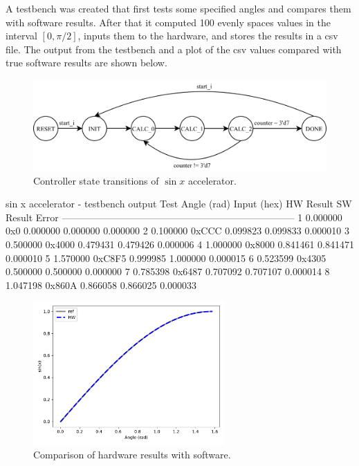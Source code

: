 \documentclass[../main.tex]{subfiles}
\begin{document}
\newpage

A testbench was created that first tests some specified angles and compares them with software results. After that it computed 100 evenly spaces values in the interval $[0, \pi/2]$, inputs them to the hardware, and stores the results in a csv file. The output from the testbench and a plot of the csv values compared with true software results are shown below.

\begin{figure}[h]
    \centering
    \includegraphics[width=\linewidth]{assets/q5_cont.png}
    \caption{Controller state transitions of $\sin x$ accelerator.}
    \label{fig:q5_cont}
\end{figure}

\begin{textcode}{sin x accelerator - testbench output}
Test     Angle (rad)  Input (hex)  HW Result    SW Result    Error     
------------------------------------------------------------------------
1        0.000000     0x0          0.000000     0.000000     0.000000  
2        0.100000     0xCCC        0.099823     0.099833     0.000010  
3        0.500000     0x4000       0.479431     0.479426     0.000006  
4        1.000000     0x8000       0.841461     0.841471     0.000010  
5        1.570000     0xC8F5       0.999985     1.000000     0.000015  
6        0.523599     0x4305       0.500000     0.500000     0.000000  
7        0.785398     0x6487       0.707092     0.707107     0.000014  
8        1.047198     0x860A       0.866058     0.866025     0.000033  
\end{textcode}

\begin{figure}[H]
    \centering
    \includegraphics[width=0.65\textwidth]{assets/q5_sin.pdf}
    \caption{Comparison of hardware results with software.}
\end{figure}
\end{document}
